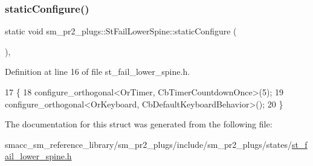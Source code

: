 \subsubsection{\texorpdfstring{static\+Configure()}{staticConfigure()}}
{\footnotesize\ttfamily static void sm\+\_\+pr2\+\_\+plugs\+::\+St\+Fail\+Lower\+Spine\+::static\+Configure (\begin{DoxyParamCaption}{ }\end{DoxyParamCaption})\hspace{0.3cm}{\ttfamily [inline]}, {\ttfamily [static]}}



Definition at line 16 of file st\+\_\+fail\+\_\+lower\+\_\+spine.\+h.


\begin{DoxyCode}
17     \{
18         configure\_orthogonal<OrTimer,  CbTimerCountdownOnce>(5);    
19         configure\_orthogonal<OrKeyboard, CbDefaultKeyboardBehavior>();
20     \}
\end{DoxyCode}


The documentation for this struct was generated from the following file\+:\begin{DoxyCompactItemize}
\item 
smacc\+\_\+sm\+\_\+reference\+\_\+library/sm\+\_\+pr2\+\_\+plugs/include/sm\+\_\+pr2\+\_\+plugs/states/\hyperlink{st__fail__lower__spine_8h}{st\+\_\+fail\+\_\+lower\+\_\+spine.\+h}\end{DoxyCompactItemize}
